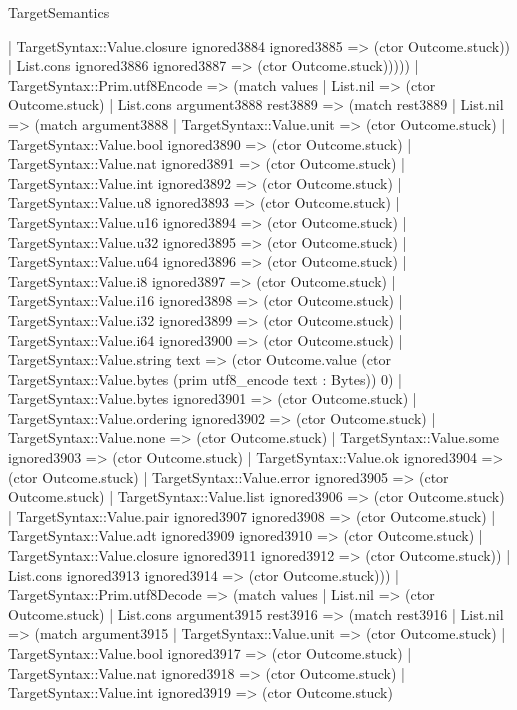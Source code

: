 \begin{lexlean}{TargetSemantics}
\begin{semanticmodule}
{              | TargetSyntax::Value.closure ignored3884 ignored3885 => (ctor Outcome.stuck))
            | List.cons ignored3886 ignored3887 => (ctor Outcome.stuck)))))
    | TargetSyntax::Prim.utf8Encode => (match values
      | List.nil => (ctor Outcome.stuck)
      | List.cons argument3888 rest3889 => (match rest3889
        | List.nil => (match argument3888
          | TargetSyntax::Value.unit => (ctor Outcome.stuck)
          | TargetSyntax::Value.bool ignored3890 => (ctor Outcome.stuck)
          | TargetSyntax::Value.nat ignored3891 => (ctor Outcome.stuck)
          | TargetSyntax::Value.int ignored3892 => (ctor Outcome.stuck)
          | TargetSyntax::Value.u8 ignored3893 => (ctor Outcome.stuck)
          | TargetSyntax::Value.u16 ignored3894 => (ctor Outcome.stuck)
          | TargetSyntax::Value.u32 ignored3895 => (ctor Outcome.stuck)
          | TargetSyntax::Value.u64 ignored3896 => (ctor Outcome.stuck)
          | TargetSyntax::Value.i8 ignored3897 => (ctor Outcome.stuck)
          | TargetSyntax::Value.i16 ignored3898 => (ctor Outcome.stuck)
          | TargetSyntax::Value.i32 ignored3899 => (ctor Outcome.stuck)
          | TargetSyntax::Value.i64 ignored3900 => (ctor Outcome.stuck)
          | TargetSyntax::Value.string text => (ctor Outcome.value (ctor TargetSyntax::Value.bytes (prim utf8_encode text : Bytes)) 0)
          | TargetSyntax::Value.bytes ignored3901 => (ctor Outcome.stuck)
          | TargetSyntax::Value.ordering ignored3902 => (ctor Outcome.stuck)
          | TargetSyntax::Value.none => (ctor Outcome.stuck)
          | TargetSyntax::Value.some ignored3903 => (ctor Outcome.stuck)
          | TargetSyntax::Value.ok ignored3904 => (ctor Outcome.stuck)
          | TargetSyntax::Value.error ignored3905 => (ctor Outcome.stuck)
          | TargetSyntax::Value.list ignored3906 => (ctor Outcome.stuck)
          | TargetSyntax::Value.pair ignored3907 ignored3908 => (ctor Outcome.stuck)
          | TargetSyntax::Value.adt ignored3909 ignored3910 => (ctor Outcome.stuck)
          | TargetSyntax::Value.closure ignored3911 ignored3912 => (ctor Outcome.stuck))
        | List.cons ignored3913 ignored3914 => (ctor Outcome.stuck)))
    | TargetSyntax::Prim.utf8Decode => (match values
      | List.nil => (ctor Outcome.stuck)
      | List.cons argument3915 rest3916 => (match rest3916
        | List.nil => (match argument3915
          | TargetSyntax::Value.unit => (ctor Outcome.stuck)
          | TargetSyntax::Value.bool ignored3917 => (ctor Outcome.stuck)
          | TargetSyntax::Value.nat ignored3918 => (ctor Outcome.stuck)
          | TargetSyntax::Value.int ignored3919 => (ctor Outcome.stuck)
}
\end{semanticmodule}
\end{lexlean}
